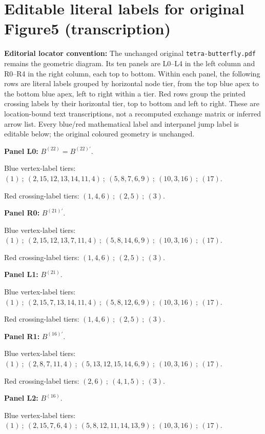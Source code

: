 \section*{Editable literal labels for original Figure5 (transcription)}
\noindent\textbf{Editorial locator convention:} The unchanged original \texttt{tetra-butterfly.pdf} remains the geometric diagram. Its ten panels are L0--L4 in the left column and R0--R4 in the right column, each top to bottom. Within each panel, the following rows are literal labels grouped by horizontal node tier, from the top blue apex to the bottom blue apex, left to right within a tier. Red rows group the printed crossing labels by their horizontal tier, top to bottom and left to right. These are location-bound text transcriptions, not a recomputed exchange matrix or inferred arrow list. Every blue/red mathematical label and interpanel jump label is editable below; the original coloured geometry is unchanged.\par
\medskip\noindent\textbf{Panel L0:} $B^{(22)}=B^{(22)\prime}$.\par
\noindent Blue vertex-label tiers: $(1)\ ;\ (2,15,12,13,14,11,4)\ ;\ (5,8,7,6,9)\ ;\ (10,3,16)\ ;\ (17)$.\par
\noindent Red crossing-label tiers: $(1,4,6)\ ;\ (2,5)\ ;\ (3)$.\par
\medskip\noindent\textbf{Panel R0:} $B^{(21)\prime}$.\par
\noindent Blue vertex-label tiers: $(1)\ ;\ (2,15,12,13,7,11,4)\ ;\ (5,8,14,6,9)\ ;\ (10,3,16)\ ;\ (17)$.\par
\noindent Red crossing-label tiers: $(1,4,6)\ ;\ (2,5)\ ;\ (3)$.\par
\medskip\noindent\textbf{Panel L1:} $B^{(21)}$.\par
\noindent Blue vertex-label tiers: $(1)\ ;\ (2,15,7,13,14,11,4)\ ;\ (5,8,12,6,9)\ ;\ (10,3,16)\ ;\ (17)$.\par
\noindent Red crossing-label tiers: $(1,4,6)\ ;\ (2,5)\ ;\ (3)$.\par
\medskip\noindent\textbf{Panel R1:} $B^{(16)\prime}$.\par
\noindent Blue vertex-label tiers: $(1)\ ;\ (2,8,7,11,4)\ ;\ (5,13,12,15,14,6,9)\ ;\ (10,3,16)\ ;\ (17)$.\par
\noindent Red crossing-label tiers: $(2,6)\ ;\ (4,1,5)\ ;\ (3)$.\par
\medskip\noindent\textbf{Panel L2:} $B^{(16)}$.\par
\noindent Blue vertex-label tiers: $(1)\ ;\ (2,15,7,6,4)\ ;\ (5,8,12,11,14,13,9)\ ;\ (10,3,16)\ ;\ (17)$.\par
